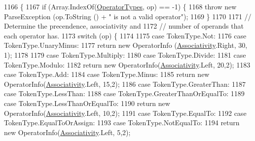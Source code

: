 \begin{DoxyCode}
1166                                                                        \{
1167                 \textcolor{keywordflow}{if} (Array.IndexOf(\hyperlink{a00143_ad8a4bb1b46dbc3d1b7708e78a2d97e1c}{OperatorTypes}, op) == -1) \{
1168                     \textcolor{keywordflow}{throw} \textcolor{keyword}{new} ParseException (op.ToString () + \textcolor{stringliteral}{" is not a valid operator"});
1169                 \}
1170 
1171                 \textcolor{comment}{// Determine the precendence, associativity and}
1172                 \textcolor{comment}{// number of operands that each operator has.}
1173                 \textcolor{keywordflow}{switch} (op) \{
1174 
1175                 \textcolor{keywordflow}{case} TokenType.Not:
1176                 \textcolor{keywordflow}{case} TokenType.UnaryMinus:
1177                     \textcolor{keywordflow}{return} \textcolor{keyword}{new} OperatorInfo (\hyperlink{a00143_a83fa1b8db0e6678006920812b6f33f62}{Associativity}.Right, 30, 1);
1178 
1179                 \textcolor{keywordflow}{case} TokenType.Multiply:
1180                 \textcolor{keywordflow}{case} TokenType.Divide:
1181                 \textcolor{keywordflow}{case} TokenType.Modulo:
1182                     \textcolor{keywordflow}{return} \textcolor{keyword}{new} OperatorInfo(\hyperlink{a00143_a83fa1b8db0e6678006920812b6f33f62}{Associativity}.Left, 20,2);
1183                 \textcolor{keywordflow}{case} TokenType.Add:
1184                 \textcolor{keywordflow}{case} TokenType.Minus:
1185                     \textcolor{keywordflow}{return} \textcolor{keyword}{new} OperatorInfo(\hyperlink{a00143_a83fa1b8db0e6678006920812b6f33f62}{Associativity}.Left, 15,2);
1186                 \textcolor{keywordflow}{case} TokenType.GreaterThan:
1187                 \textcolor{keywordflow}{case} TokenType.LessThan:
1188                 \textcolor{keywordflow}{case} TokenType.GreaterThanOrEqualTo:
1189                 \textcolor{keywordflow}{case} TokenType.LessThanOrEqualTo:
1190                     \textcolor{keywordflow}{return} \textcolor{keyword}{new} OperatorInfo(\hyperlink{a00143_a83fa1b8db0e6678006920812b6f33f62}{Associativity}.Left, 10,2);
1191                 \textcolor{keywordflow}{case} TokenType.EqualTo:
1192                 \textcolor{keywordflow}{case} TokenType.EqualToOrAssign:
1193                 \textcolor{keywordflow}{case} TokenType.NotEqualTo:
1194                     \textcolor{keywordflow}{return} \textcolor{keyword}{new} OperatorInfo(\hyperlink{a00143_a83fa1b8db0e6678006920812b6f33f62}{Associativity}.Left, 5,2);

\end{DoxyCode}
